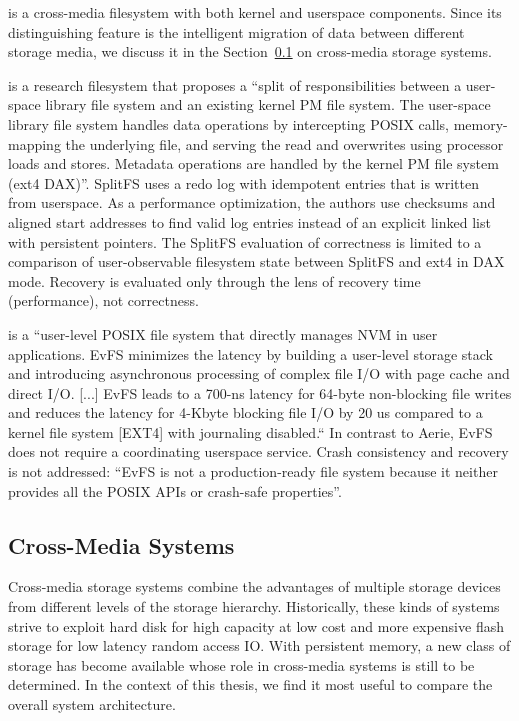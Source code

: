\documentclass[12pt,a4paper,twoside]{book}
\begin{document}
 is a cross-media filesystem with both kernel and userspace components.
Since its distinguishing feature is the intelligent migration of data between different storage media, we discuss it in the Section~\ref{sec:cross_media_storage_systems} on cross-media storage systems.

 is a research filesystem that proposes a
“split of responsibilities between a user-space library file system and an existing kernel PM file system.
The user-space library file system handles data operations by intercepting POSIX calls, memory-mapping the underlying file, and serving the read and overwrites using processor loads and stores.
Metadata operations are handled by the kernel PM file system (ext4 DAX)”.
SplitFS uses a redo log with idempotent entries that is written from userspace.
As a performance optimization, the authors use checksums and aligned start addresses to find valid log entries instead of an explicit linked list with persistent pointers.
The SplitFS evaluation of correctness is limited to a comparison of user-observable filesystem state between SplitFS and ext4 in DAX mode.
Recovery is evaluated only through the lens of recovery time (performance), not correctness.

 is a
“user-level POSIX file system that directly manages NVM in user applications.
EvFS minimizes the latency by building a user-level storage stack and introducing asynchronous processing of complex file I/O with page cache and direct I/O.
[...]
EvFS leads to a 700-ns latency for 64-byte non-blocking file writes and reduces the latency for 4-Kbyte blocking file I/O by 20 us compared to a kernel file system [EXT4] with journaling disabled.“
In contrast to Aerie, EvFS does not require a coordinating userspace service.
Crash consistency and recovery is not addressed:
“EvFS is not a production-ready file system because it neither provides all the POSIX APIs or crash-safe properties”.

\subsection{Cross-Media Systems}\label{sec:cross_media_storage_systems}
Cross-media storage systems combine the advantages of multiple storage devices from different levels of the storage hierarchy.
Historically, these kinds of systems strive to exploit hard disk for high capacity at low cost and more expensive flash storage for low latency random access IO.
With persistent memory, a new class of storage has become available whose role in cross-media systems is still to be determined.
In the context of this thesis, we find it most useful to compare the overall system architecture.
\end{document}

